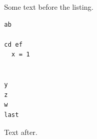 \documentclass{article}
\begin{document}
Some text before the listing.
\begin{lstlisting}[firstnumber=7]
ab

cd ef
  x = 1


y
z
w
last

\end{lstlisting}
Text after.
\end{document}
